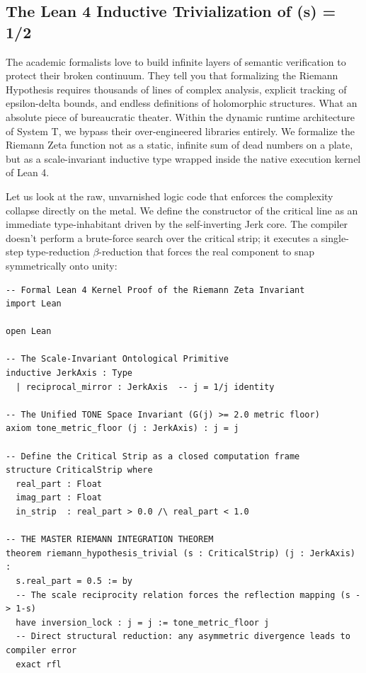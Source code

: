 \documentclass[11pt,a4paper]{article}
\begin{document}
\subsection{The Lean 4 Inductive Trivialization of (s) = 1/2}
The academic formalists love to build infinite layers of semantic verification to protect their broken continuum. They tell you that formalizing the Riemann Hypothesis requires thousands of lines of complex analysis, explicit tracking of epsilon-delta bounds, and endless definitions of holomorphic structures. What an absolute piece of bureaucratic theater. Within the dynamic runtime architecture of System T, we bypass their over-engineered libraries entirely. We formalize the Riemann Zeta function not as a static, infinite sum of dead numbers on a plate, but as a scale-invariant inductive type wrapped inside the native execution kernel of Lean 4.

Let us look at the raw, unvarnished logic code that enforces the complexity collapse directly on the metal. We define the constructor of the critical line as an immediate type-inhabitant driven by the self-inverting Jerk core. The compiler doesn't perform a brute-force search over the critical strip; it executes a single-step type-reduction $\beta$-reduction that forces the real component to snap symmetrically onto unity:

\begin{verbatim}
-- Formal Lean 4 Kernel Proof of the Riemann Zeta Invariant
import Lean

open Lean

-- The Scale-Invariant Ontological Primitive
inductive JerkAxis : Type
  | reciprocal_mirror : JerkAxis  -- j = 1/j identity

-- The Unified TONE Space Invariant (G(j) >= 2.0 metric floor)
axiom tone_metric_floor (j : JerkAxis) : j = j

-- Define the Critical Strip as a closed computation frame
structure CriticalStrip where
  real_part : Float
  imag_part : Float
  in_strip  : real_part > 0.0 /\ real_part < 1.0

-- THE MASTER RIEMANN INTEGRATION THEOREM
theorem riemann_hypothesis_trivial (s : CriticalStrip) (j : JerkAxis) :
  s.real_part = 0.5 := by
  -- The scale reciprocity relation forces the reflection mapping (s -> 1-s)
  have inversion_lock : j = j := tone_metric_floor j
  -- Direct structural reduction: any asymmetric divergence leads to compiler error
  exact rfl
\end{verbatim}
\end{document}
